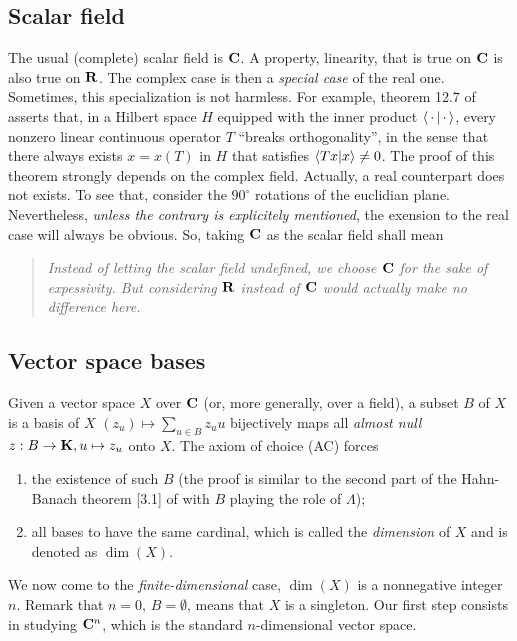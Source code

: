 \subsection{Scalar field}%
The usual (complete) scalar field is ${\mathbf C}$. %
A property, \eg linearity, that is true on ${\mathbf C}$ is also true on ${\mathbf R}$. %
The complex case is then a {\it special case} of the real one. %
Sometimes, this specialization is not harmless. %
For example, theorem 12.7 of \cite{FA} asserts that, in a Hilbert space $H$ %
equipped with the inner product $\bra{\,\cdot\,}\ket{\,\cdot\,}$, %
every nonzero linear continuous operator $T$ ``breaks orthogonality'', %
in the sense that there always exists $x=x(T)$ in $H$ that satisfies %
%
  $\bra{Tx}\ket{x} \neq 0$. %
%
The proof of this theorem strongly depends on the complex field. %
Actually, a real counterpart does not exists. %
To see that, consider the $90^\circ$ rotations of the euclidian plane. %
%
Nevertheless, {\it unless the contrary is explicitely mentioned}, %
the exension to the real case will always be obvious. %
So, taking ${\mathbf C}$ as the scalar field shall mean %
%
\begin{quote}{\it %
  Instead of letting the scalar field undefined, we choose ${\mathbf C}$ for the sake of %
  expessivity. But considering ${\mathbf R}$ instead of %
  ${\mathbf C}$ would actually make no difference here.
}
\end{quote}
%
\subsection{Vector space bases}\label{notations: vector spaces: vector space bases}
Given a vector space $X$ over ${\mathbf C}$ (or, more generally, over a field), %
a subset $B$ of $X$ is a basis of $X$ \iif %
$(z_u) \mapsto \sum_{u\in B} z_u u$ bijectively maps all {\it almost null} %
$z: B \to {\mathbf K}, u \mapsto z_u$ %
onto $X$. %
%
The axiom of choice (AC) forces %
\begin{enumerate}
  \item the existence of such $B$ %
    (the proof is similar to the second part of the Hahn-Banach theorem [3.1] of \cite{FA} %
    with $B$ playing the role of $\Lambda$); %
  \item all bases to have the same cardinal, %
    which is called the {\it dimension} of $X$ and is denoted as $\dim(X)$. %
\end{enumerate}
%
We now come to the {\it finite-dimensional} case, \ie $\dim(X)$ is a nonnegative integer $n$. %
Remark that $n=0$, \ie $B=\emptyset$, means that $X$ is a singleton. %
%
Our first step consists in studying ${\mathbf C}^n$, which is the standard $n$-dimensional vector space.
%
